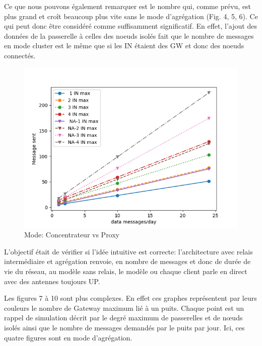 Ce que nous pouvons également remarquer est le nombre qui, comme prévu, est plus grand et croît beaucoup plus vite sans le mode d'agrégation (Fig. 4, 5, 6).
Ce qui peut donc être considéré comme suffisamment significatif. En effet, l'ajout des données de la passerelle à celles des noeuds isolés fait que le nombre de messages en mode cluster est le même que si les IN étaient des GW et donc des noeuds connectés.
\begin{figure}[htbp]
\centerline{\includegraphics[scale = 0.5]{graphics_resultats/A/AvsNA.png}}
\caption{Mode: Concentrateur vs Proxy}
\label{A}
\end{figure}

L'objectif était de vérifier si l'idée intuitive est correcte: l'architecture avec relais intermédiaire et agrégation renvoie, en nombre de messages et donc de durée de vie du réseau, au modèle sans relais, le modèle ou chaque client parle en direct avec des antennes toujours UP.

Les figures 7 à 10 sont plus complexes. En effet ces graphes représentent par leurs couleurs le nombre de Gateway maximum lié à un puits. Chaque point est un rappel de simulation décrit par le degré maximum de passerelles et de nœuds isolés ainsi que le nombre de messages demandés par le puits par jour. Ici, ces quatre figures sont en mode d'agrégation.

